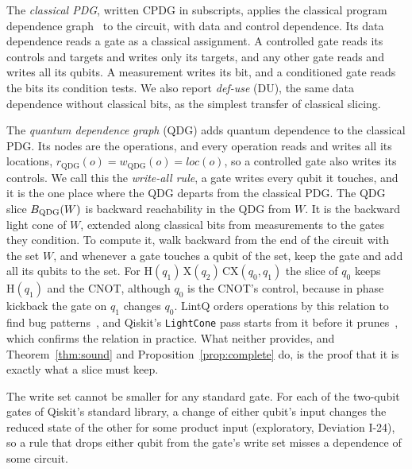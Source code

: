 The \emph{classical PDG}, written CPDG in subscripts, applies the classical program dependence
graph~\cite{ferrante1987pdg} to the circuit, with data and control dependence. Its data dependence reads
a gate as a classical assignment. A controlled gate reads its controls and targets and writes only its
targets, and any other gate reads and writes all its qubits. A measurement writes its bit, and a
conditioned gate reads the bits its condition tests. We also report \emph{def-use} (DU), the same data
dependence without classical bits, as the simplest transfer of classical slicing.

The \emph{quantum dependence graph} (QDG) adds quantum dependence to the classical PDG. Its nodes are
the operations, and every operation reads and writes all its locations,
$r_{\mathrm{QDG}}(o) = w_{\mathrm{QDG}}(o) = \mathit{loc}(o)$, so a controlled gate also writes its
controls. We call this the \emph{write-all rule}, a gate writes every qubit it touches, and it is the one
place where the QDG departs from the classical PDG. The QDG slice $B_{\mathrm{QDG}}(W)$ is backward reachability in the QDG from $W$. It is the backward light
cone of $W$, extended along classical bits from measurements to the gates they condition. To compute it, walk
backward from the end of the circuit with the set $W$, and whenever a gate touches a qubit of the set, keep
the gate and add all its qubits to the set. For $\mathrm{H}(q_1)\,\mathrm{X}(q_2)\,\mathrm{CX}(q_0, q_1)$ the
slice of $q_0$ keeps $\mathrm{H}(q_1)$ and the CNOT, although $q_0$ is the CNOT's control, because in phase
kickback the gate on $q_1$ changes $q_0$. LintQ orders
operations by this relation to find bug patterns~\cite{paltenghi2024lintq}, and Qiskit's
\texttt{LightCone} pass starts from it before it prunes~\cite{qiskit2025}, which confirms the relation in
practice. What neither provides, and Theorem~\ref{thm:sound} and Proposition~\ref{prop:complete} do, is the
proof that it is exactly what a slice must keep.

The write set cannot be smaller for any standard gate. For each of the \numGateSignalN{} two-qubit gates
of Qiskit's standard library, a change of either qubit's input changes the reduced state of the other for
some product input (exploratory, Deviation I-24), so a rule that drops either qubit from the gate's write
set misses a dependence of some circuit.

